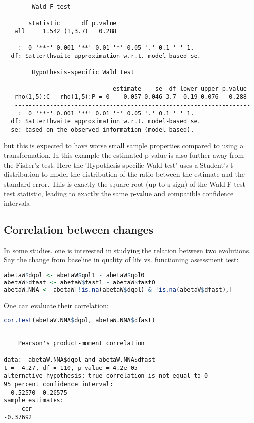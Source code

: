 \documentclass[12pt]{article}
\begin{document}
\label{}
\begin{verbatim}
		Wald F-test 

       statistic      df p.value  
   all     1.542 (1,3.7)   0.288  
   ------------------------------ 
    :  0 '***' 0.001 '**' 0.01 '*' 0.05 '.' 0.1 ' ' 1.
  df: Satterthwaite approximation w.r.t. model-based se. 

		Hypothesis-specific Wald test 

                               estimate    se  df lower upper p.value  
   rho(1,5):C - rho(1,5):P = 0   -0.057 0.046 3.7 -0.19 0.076   0.288  
   ------------------------------------------------------------------- 
    :  0 '***' 0.001 '**' 0.01 '*' 0.05 '.' 0.1 ' ' 1.
  df: Satterthwaite approximation w.r.t. model-based se. 
  se: based on the observed information (model-based).
\end{verbatim}

but this is expected to have worse small sample properties compared to
using a transformation. In this example the estimated p-value is also
further away from the Fisher'z test. Here the 'Hypothesis-specific
Wald test' uses a Student's t-distribution to model the distribution
of the ratio between the estimate and the standard error. This is
exactly the square root (up to a sign) of the Wald F-test test
statistic, leading to exactly the same p-value and compatible
confidence intervals.

\clearpage
\subsection{Correlation between changes}
\label{sec:org5cec876}

In some studies, one is interested in studying the relation between
two evolutions. Say the change from baseline in quality of life
vs. functioning assessment test:
\begin{lstlisting}[language=r,numbers=none]
abetaW$dqol <- abetaW$qol1 - abetaW$qol0
abetaW$dfast <- abetaW$fast1 - abetaW$fast0
abetaW.NNA <- abetaW[!is.na(abetaW$dqol) & !is.na(abetaW$dfast),]
\end{lstlisting}

\bigskip

One can evaluate their correlation:
\begin{lstlisting}[language=r,numbers=none]
cor.test(abetaW.NNA$dqol, abetaW.NNA$dfast)
\end{lstlisting}

\label{}
\begin{verbatim}

	Pearson's product-moment correlation

data:  abetaW.NNA$dqol and abetaW.NNA$dfast
t = -4.27, df = 110, p-value = 4.2e-05
alternative hypothesis: true correlation is not equal to 0
95 percent confidence interval:
 -0.52570 -0.20575
sample estimates:
     cor 
-0.37692
\end{verbatim}
\end{document}
